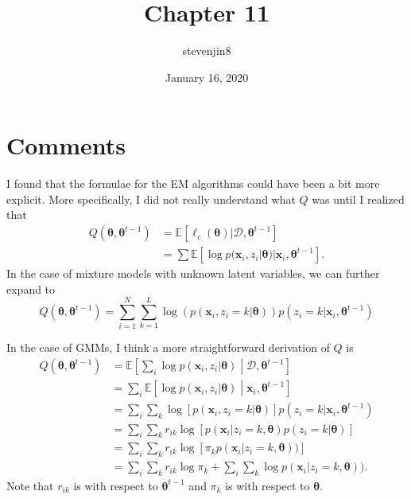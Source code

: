 \documentclass[a4paper,11pt]{article}
\title{Chapter 11}
\author{stevenjin8}
\date{January 16, 2020}
\begin{document}
\maketitle

\section*{Comments}

I found that the formulae for the EM algorithms could have been a bit more explicit. More
specifically, I did not really understand what $Q$ was until I realized that
\begin{align*}
    Q( \boldsymbol{\theta}, \boldsymbol{\theta}^{t-1} )
    &= \mathbb{E}[ \ell_c( \boldsymbol{\theta} ) | \mathcal{D}, \boldsymbol{\theta} ^ {t-1} ] \\
    &= \sum \mathbb{E}[
		\log p( \mathbf{x}_i, z_i | \boldsymbol{\theta} )
		| \mathbf{x}_i, \boldsymbol{\theta}^{t-1}
	].
\end{align*}
In the case of mixture models with unknown latent variables, we can further expand to
\[
    Q( \boldsymbol{\theta}, \boldsymbol{\theta} ^ {t-1} ) = \sum\limits_{i=1}^N \sum\limits_{k=1}^L
    \log( p(\mathbf{x}_i, z_i=k | \boldsymbol{\theta}) )
    p( z_i=k | \mathbf{x}_i, \boldsymbol{\theta} ^ {t-1} )
\]

In the case of GMMs, I think a more straightforward derivation of $Q$ is
\begin{align*}
    Q( \boldsymbol{\theta}, \boldsymbol{\theta} ^ {t-1} )
    &= \mathbb{E}\left[ \sum\limits_i \log p( \mathbf{x}_i, z_i | \boldsymbol{\theta} )
		\middle| \mathcal{D}, \boldsymbol{\theta} ^ {t-1}
	\right] \\
    &= \sum\limits_i \mathbb{E}\left[
		\log p( \mathbf{x}_i, z_i | \boldsymbol{\theta} )
		\middle| \mathbf{x}_i, \boldsymbol{\theta} ^ {t-1}
	\right] \\
    &= \sum\limits_i \sum\limits_k \log[ p( \mathbf{x}_i, z_i=k | \boldsymbol{\theta} )]
    p( z_i=k | \mathbf{x}_i, \boldsymbol{\theta} ^ {t-1} ) \\
    &= \sum\limits_i\sum\limits_k
    r_{ik} \log[ p( \mathbf{x}_i | z_i=k, \boldsymbol{\theta} ) p( z_i=k | \boldsymbol{\theta} )] \\
    &= \sum\limits_i\sum\limits_k
    r_{ik} \log[ \pi_k p( \mathbf{x}_i | z_i=k, \boldsymbol{\theta} ))] \\
    &= \sum\limits_i \sum\limits_k
	r_{ik} \log\pi_k
	+ \sum\limits_i \sum\limits_k
	\log p( \mathbf{x}_i | z_i=k, \boldsymbol{\theta} )).
\end{align*}
Note that $r_{ik}$ is with respect to $\boldsymbol{\theta} ^ {t-1}$ and $\pi_k$ is with respect to
$\boldsymbol{\theta}$.
\end{document}
